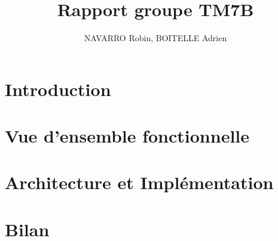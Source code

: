 \documentclass[12pt]{article}
\title{Rapport groupe TM7B}
\author{NAVARRO Robin, BOITELLE Adrien}
\begin{document}
\maketitle

\newpage
\tableofcontents
\newpage

\section{Introduction}
\newpage

\section{Vue d'ensemble fonctionnelle}
\newpage

\section{Architecture et Implémentation}
\newpage

\section{Bilan}
\end{document}
